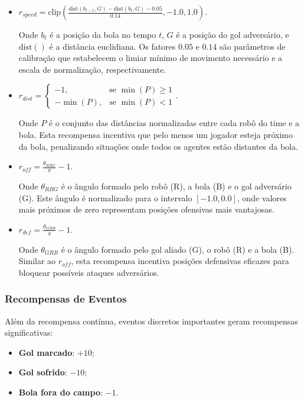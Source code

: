 \begin{itemize}
    \item $r_{speed} = \text{clip}\left(\frac{\text{dist}(b_{t-1}, G) - \text{dist}(b_t, G) - 0.05}{0.14}, -1.0, 1.0\right).$
    
    Onde $b_t$ é a posição da bola no tempo $t$, $G$ é a posição do gol adversário, e $\text{dist}()$ é a distância euclidiana. Os fatores $0.05$ e $0.14$ são parâmetros de calibração que estabelecem o limiar mínimo de movimento necessário e a escala de normalização, respectivamente.
    
    \item $r_{dist} = 
    \begin{cases}
      -1, & \text{se } \min(P) \geq 1 \\
      -\min(P), & \text{se } \min(P) < 1
    \end{cases}.$
    
    Onde $P$ é o conjunto das distâncias normalizadas entre cada robô do time e a bola. Esta recompensa incentiva que pelo menos um jogador esteja próximo da bola, penalizando situações onde todos os agentes estão distantes da bola.
    
    \item $r_{off} = \frac{\theta_{RBG}}{\pi} - 1.$
    
    Onde $\theta_{RBG}$ é o ângulo formado pelo robô (R), a bola (B) e o gol adversário (G). Este ângulo é normalizado para o intervalo $[-1.0, 0.0]$, onde valores mais próximos de zero representam posições ofensivas mais vantajosas.
    
    \item $r_{def} = \frac{\theta_{GRB}}{\pi} - 1.$
    
    Onde $\theta_{GRB}$ é o ângulo formado pelo gol aliado (G), o robô (R) e a bola (B). Similar ao $r_{off}$, esta recompensa incentiva posições defensivas eficazes para bloquear possíveis ataques adversários.
\end{itemize}

\subsubsection{Recompensas de Eventos}

Além da recompensa contínua, eventos discretos importantes geram recompensas significativas:

\begin{itemize}
    \item \textbf{Gol marcado}: $+10$;
    \item \textbf{Gol sofrido}: $-10$;
    \item \textbf{Bola fora do campo}: $-1$.
\end{itemize}

